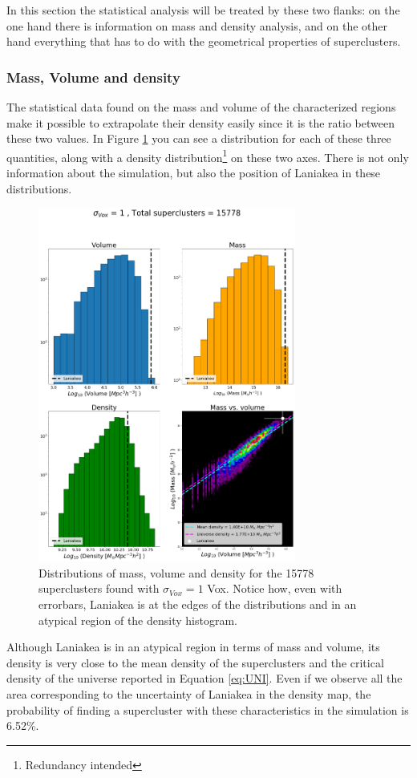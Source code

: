 \documentclass[a4paper,fleqn,usenatbib]{mnras}
\begin{document}
In this section the statistical analysis will be treated by these two flanks: on the one hand there is information on mass and density analysis, and on the other hand everything that has to do with the geometrical properties of superclusters.

\subsubsection{Mass, Volume and density}

The statistical data found on the mass and volume of the characterized regions make it possible to extrapolate their density easily since it is the ratio between these two values. In Figure \ref{fig:HISTVMD1} you can see a distribution for each of these three quantities, along with a density distribution\footnote{Redundancy intended} on these two axes. There is not only information about the simulation, but also the position of Laniakea in these distributions.

\begin{figure}
    \centering
    \includegraphics[width=240pt]{HistVMD_1.png}
    \caption{Distributions of mass, volume and density for the 15778 superclusters found with $\sigma_{Vox} = 1 $ Vox. Notice how, even with errorbars, Laniakea is at the edges of the distributions and in an atypical region of the density histogram. }
    \label{fig:HISTVMD1}
\end{figure}

Although Laniakea is in an atypical region in terms of mass and volume, its density is very close to the mean density of the superclusters and the critical density of the universe reported in Equation \ref{eq:UNI}. Even if we observe all the area corresponding to the uncertainty of Laniakea in the density map, the probability of finding a supercluster with these characteristics in the simulation is 6.52\%.
\end{document}
